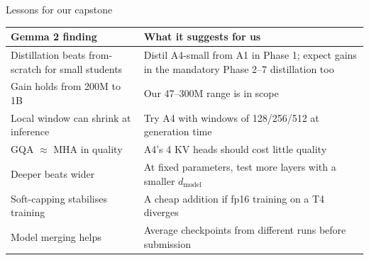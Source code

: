 \documentclass[aspectratio=169,11pt]{beamer}
\begin{document}
\begin{frame}{Lessons for our capstone}
  \small
  \begin{tabularx}{\textwidth}{@{}lX@{}}
    \toprule
    Gemma 2 finding & What it suggests for us\\
    \midrule
    Distillation beats from-scratch for small students & Distil A4-small from A1 in Phase 1; expect gains in the mandatory Phase 2--7 distillation too\\
    Gain holds from 200M to 1B & Our 47--300M range is in scope\\
    Local window can shrink at inference & Try A4 with windows of 128/256/512 at generation time\\
    GQA $\approx$ MHA in quality & A4's 4 KV heads should cost little quality\\
    Deeper beats wider & At fixed parameters, test more layers with a smaller $d_{\text{model}}$\\
    Soft-capping stabilises training & A cheap addition if fp16 training on a T4 diverges\\
    Model merging helps & Average checkpoints from different runs before submission\\
    \bottomrule
  \end{tabularx}
\end{frame}
\end{document}
